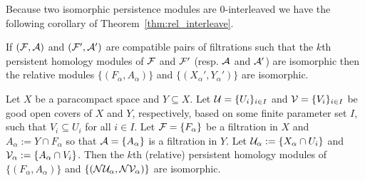 Because two isomorphic persistence modules are $0$-interleaved we have the following corollary of Theorem~\ref{thm:rel_interleave}.

\begin{corollary}\label{cor:rel_interleave_iso}
  If $(\mathcal{F}, \mathcal{A})$ and $(\mathcal{F}', \mathcal{A}')$ are compatible pairs of filtrations such that the $k$th persistent homology modules of $\mathcal{F}$ and $\mathcal{F}'$ (resp. $\mathcal{A}$ and $\mathcal{A}'$) are isomorphic then the relative modules $\{(F_\alpha, A_\alpha)\}$ and $\{(X_\alpha', Y_\alpha')\}$ are isomorphic.
\end{corollary}

\begin{lemma}\label{lem:rel_pers_nerve}
  Let $X$ be a paracompact space and $Y\subseteq X$.
  Let $\mathcal{U} = \{U_i\}_{i\in I}$ and $\mathcal{V} = \{V_i\}_{i\in I}$ be good open covers of $X$ and $Y$, respectively, based on some finite parameter set $I$, such that $V_i\subseteq U_i$ for all $i\in I$.
  Let $\mathcal{F} = \{F_\alpha\}$ be a filtration in $X$ and $A_\alpha := Y\cap F_\alpha$ so that $\mathcal{A} = \{A_\alpha\}$ is a filtration in $Y$.
  Let $\mathcal{U}_\alpha := \{X_\alpha\cap U_i\}$ and $\mathcal{V}_\alpha := \{A_\alpha\cap V_i\}$.
  Then the $k$th (relative) persistent homology modules of $\{(F_\alpha, A_\alpha)\}$ and $\{(\mathcal{N}\mathcal{U}_\alpha, \mathcal{N}\mathcal{V}_\alpha)\}$ are isomorphic.
\end{lemma}
